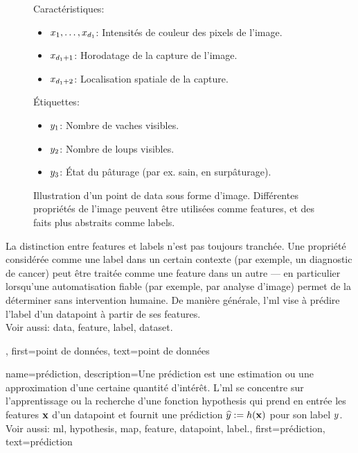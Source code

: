 {{\begin{figure}[htbp]
\begin{minipage}[t]{0.95\textwidth}
			\end{minipage}
			\begin{minipage}[t]{0.95\textwidth}
				Caractéristiques:
				\begin{itemize}
					\item $x_{1},\ldots,x_{d_{1}}$: Intensités de couleur des pixels de l’image.
					\item $x_{d_{1}+1}$: Horodatage de la capture de l’image.
					\item $x_{d_{1}+2}$: Localisation spatiale de la capture.
				\end{itemize}
				Étiquettes:
				\begin{itemize}
					\item $y_{1}$: Nombre de vaches visibles.
					\item $y_{2}$: Nombre de loups visibles.
					\item $y_{3}$: État du pâturage (par ex. sain, en surpâturage).
				\end{itemize}
			\end{minipage}
			\caption{Illustration d’un point de \gls{data} sous forme d’image. Différentes propriétés de l’image 
				peuvent être utilisées comme \glspl{feature}, et des faits plus abstraits comme \glspl{label}. 
				\label{fig:datapoint_cowherd_dict}}
		\end{figure}
		La distinction entre \glspl{feature} et \glspl{label} n’est pas toujours tranchée.
		Une propriété considérée comme une \gls{label} dans un certain contexte (par exemple, un diagnostic de cancer)
		peut être traitée comme une \gls{feature} dans un autre — en particulier lorsqu’une automatisation fiable (par exemple,
		par analyse d’image) permet de la déterminer sans intervention humaine.
		De manière générale, l’\gls{ml} vise à prédire l'\gls{label} d’un \gls{datapoint} à partir de ses \glspl{feature}.
		\\
		Voir aussi: \gls{data}, \gls{feature}, \gls{label}, \gls{dataset}.},
	first={point de données},
	text={point de données}  
}

{name={prédiction},
	description={Une prédiction est une estimation ou une approximation d’une certaine quantité d’intérêt.  
		L'\gls{ml} se concentre sur l’apprentissage ou la recherche d’une fonction \gls{hypothesis}  
		qui prend en entrée les \glspl{feature} ${\bf x}$ d’un \gls{datapoint} et fournit une prédiction  
		$\widehat{y} := h({\bf x})$ pour son \gls{label} $y$.
		\\ 
		Voir aussi: \gls{ml}, \gls{hypothesis}, \gls{map}, \gls{feature}, \gls{datapoint}, \gls{label}.},
	first={prédiction}, text={prédiction}
}

